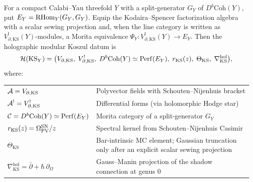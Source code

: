 \begin{theorem}
For a compact Calabi--Yau threefold $Y$ with a split-generator $G_Y$ of
$D^b\mathrm{Coh}(Y)$, put $E_Y=\operatorname{RHom}_Y(G_Y,G_Y)$. Equip the
Kodaira--Spencer factorization algebra with a scalar sewing projection
and, when the line category is written as
$V_{\partial,\mathrm{KS}}^!(Y)$-modules, a Morita equivalence
$\Psi_Y\colon V_{\partial,\mathrm{KS}}^!(Y)\to E_Y$. Then the
holographic modular Koszul datum is
\begin{equation}%
\mathcal{H}(\mathrm{KS}_Y)
= \bigl(
V_{\partial,\mathrm{KS}},\;
V_{\partial,\mathrm{KS}}^!,\;
D^b\mathrm{Coh}(Y)\simeq\Perf(E_Y),\;
r_{\mathrm{KS}}(z),\;
\Theta_{\mathrm{KS}},\;
\nabla^{\mathrm{hol}}_{\mathrm{KS}}
\bigr),
\end{equation}
where:
\begin{center}
\renewcommand{\arraystretch}{1.35}
\small
\begin{tabular}{lp{8.5cm}}
\hline
$\mathcal{A} = V_{\partial,\mathrm{KS}}$
 & Polyvector fields with Schouten--Nijenhuis bracket \\
$\mathcal{A}^! = V^!_{\partial,\mathrm{KS}}$
 & Differential forms (via holomorphic Hodge star) \\
$\mathcal{C} = D^b\mathrm{Coh}(Y)\simeq\operatorname{Perf}(E_Y)$
 & Morita category of a split-generator $G_Y$ \\
$r_{\mathrm{KS}}(z) = \Omega_{\operatorname{PV}}^{\mathrm{SN}}/z$
 & Spectral kernel from Schouten--Nijenhuis Casimir \\
$\Theta_{\mathrm{KS}}$
 & Bar-intrinsic MC element; Gaussian truncation only after an
 explicit scalar sewing projection \\
$\nabla^{\mathrm{hol}}_{\mathrm{KS}} = \bar\partial + \hbar\,\partial_\Omega$
 & Gauss--Manin projection of the shadow connection at genus $0$ \\
\hline
\end{tabular}
\end{center}
\end{theorem}

